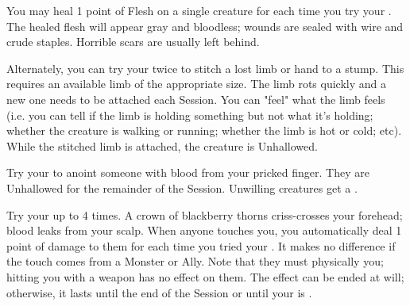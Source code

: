 

\NECRO[
  Name=Carnomancy,
  Link=witchcraft-carnomancy
]

You may heal 1 point of Flesh on a single creature for each time you try your \JUJU. The healed flesh will appear gray and bloodless; wounds are sealed with wire and crude staples.  Horrible scars are usually left behind.

Alternately, you can try your \JUJU twice to stitch a lost limb or hand to a stump. This requires an available limb of the appropriate size.  The limb rots quickly and a new one needs to be attached each Session.  You can "feel" what the limb feels (i.e. you can tell if the limb is holding something but not what it's holding; whether the creature is walking or running; whether the limb is hot or cold; etc).  While the stitched limb is attached, the creature is Unhallowed.


\NECRO[
  Name=Covenant of Blood,
  Link=witchcraft-convenant-of-blood
]

Try your \JUJU to anoint someone with blood from your pricked finger. They are Unhallowed for the remainder of the Session. Unwilling creatures get a .

\NECRO[
  Name=Crown of Thorns,
  Link=witchcraft-crown-of-thorns
]

Try your \JUJU up to 4 times. A crown of blackberry thorns criss-crosses your forehead; blood leaks from your scalp. When anyone touches you, you automatically deal 1 point of damage to them for each time you tried your \JUJU. It makes no difference if the touch comes from a Monster or Ally. Note that they must physically  you; hitting you with a weapon has no effect on them. The effect can be ended at will; otherwise, it lasts until the end of the Session or until your \JUJU is .


